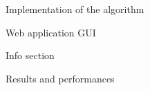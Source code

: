 \documentclass[9pt]{extarticle}
\begin{document}
\begin{section}{Implementation of the algorithm}
\begin{subsection}{Web application GUI}
\begin{subsubsection}{Info section}

            \end{subsubsection}
        \end{subsection}
    \end{section}

    \begin{section}{Results and performances}

    \end{section}
\end{document}
